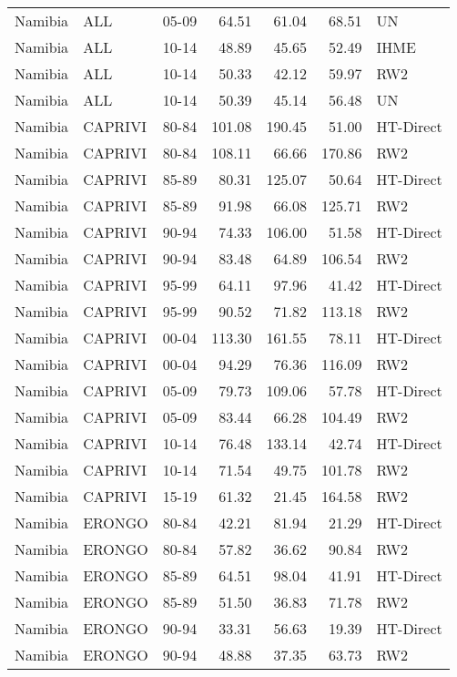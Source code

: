 \begin{longtable}{lllrrrl}
  Namibia & ALL & 05-09 & 64.51 & 61.04 & 68.51 & UN \\ 
  Namibia & ALL & 10-14 & 48.89 & 45.65 & 52.49 & IHME \\ 
  Namibia & ALL & 10-14 & 50.33 & 42.12 & 59.97 & RW2 \\ 
  Namibia & ALL & 10-14 & 50.39 & 45.14 & 56.48 & UN \\ 
  Namibia & CAPRIVI & 80-84 & 101.08 & 190.45 & 51.00 & HT-Direct \\ 
  Namibia & CAPRIVI & 80-84 & 108.11 & 66.66 & 170.86 & RW2 \\ 
  Namibia & CAPRIVI & 85-89 & 80.31 & 125.07 & 50.64 & HT-Direct \\ 
  Namibia & CAPRIVI & 85-89 & 91.98 & 66.08 & 125.71 & RW2 \\ 
  Namibia & CAPRIVI & 90-94 & 74.33 & 106.00 & 51.58 & HT-Direct \\ 
  Namibia & CAPRIVI & 90-94 & 83.48 & 64.89 & 106.54 & RW2 \\ 
  Namibia & CAPRIVI & 95-99 & 64.11 & 97.96 & 41.42 & HT-Direct \\ 
  Namibia & CAPRIVI & 95-99 & 90.52 & 71.82 & 113.18 & RW2 \\ 
  Namibia & CAPRIVI & 00-04 & 113.30 & 161.55 & 78.11 & HT-Direct \\ 
  Namibia & CAPRIVI & 00-04 & 94.29 & 76.36 & 116.09 & RW2 \\ 
  Namibia & CAPRIVI & 05-09 & 79.73 & 109.06 & 57.78 & HT-Direct \\ 
  Namibia & CAPRIVI & 05-09 & 83.44 & 66.28 & 104.49 & RW2 \\ 
  Namibia & CAPRIVI & 10-14 & 76.48 & 133.14 & 42.74 & HT-Direct \\ 
  Namibia & CAPRIVI & 10-14 & 71.54 & 49.75 & 101.78 & RW2 \\ 
  Namibia & CAPRIVI & 15-19 & 61.32 & 21.45 & 164.58 & RW2 \\ 
  Namibia & ERONGO & 80-84 & 42.21 & 81.94 & 21.29 & HT-Direct \\ 
  Namibia & ERONGO & 80-84 & 57.82 & 36.62 & 90.84 & RW2 \\ 
  Namibia & ERONGO & 85-89 & 64.51 & 98.04 & 41.91 & HT-Direct \\ 
  Namibia & ERONGO & 85-89 & 51.50 & 36.83 & 71.78 & RW2 \\ 
  Namibia & ERONGO & 90-94 & 33.31 & 56.63 & 19.39 & HT-Direct \\ 
  Namibia & ERONGO & 90-94 & 48.88 & 37.35 & 63.73 & RW2 \\ 

\end{longtable}
